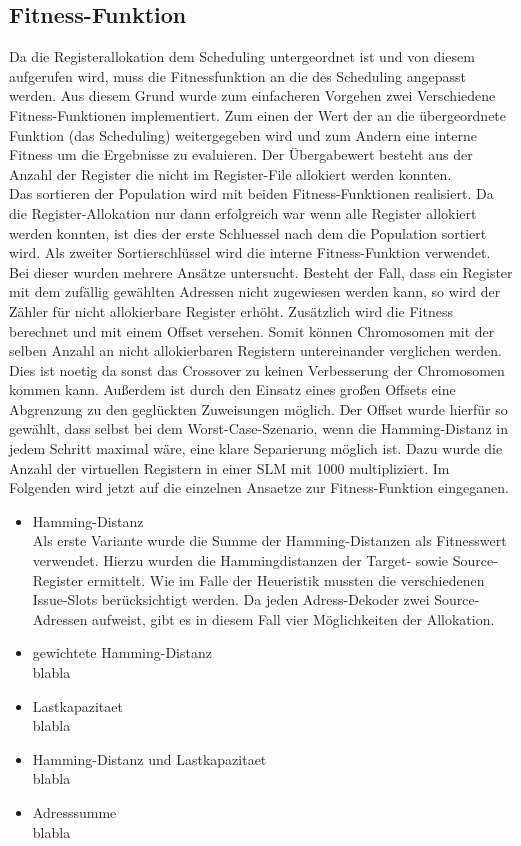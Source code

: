 \subsection{Fitness-Funktion}
\label{chap:Fitness-Funktion}
Da die Registerallokation dem Scheduling untergeordnet ist und von diesem aufgerufen wird, muss die Fitnessfunktion an die des Scheduling angepasst werden. Aus diesem Grund wurde zum einfacheren Vorgehen zwei Verschiedene Fitness-Funktionen implementiert. Zum einen der Wert der an die übergeordnete Funktion (das Scheduling) weitergegeben wird und zum Andern eine interne Fitness um die Ergebnisse zu evaluieren.
Der Übergabewert besteht aus der Anzahl der Register die nicht im Register-File allokiert werden konnten.\\
Das sortieren der Population wird mit beiden Fitness-Funktionen realisiert. Da die Register-Allokation nur dann erfolgreich war wenn alle Register allokiert werden konnten, ist dies der erste Schluessel nach dem die Population sortiert wird. Als zweiter Sortierschlüssel wird die interne Fitness-Funktion verwendet. Bei dieser wurden mehrere Ansätze untersucht.
Besteht der Fall, dass ein Register mit dem zufällig gewählten Adressen nicht zugewiesen werden kann, so wird der Zähler für nicht allokierbare Register erhöht. Zusätzlich wird die Fitness berechnet und mit einem Offset versehen. Somit können Chromosomen mit der selben Anzahl an nicht allokierbaren Registern untereinander verglichen werden. Dies ist noetig da sonst das Crossover zu keinen Verbesserung der Chromosomen kommen kann. Außerdem ist durch den Einsatz eines großen Offsets eine Abgrenzung zu den geglückten Zuweisungen möglich. Der Offset wurde hierfür  so gewählt, dass selbst bei dem Worst-Case-Szenario, wenn die Hamming-Distanz in jedem Schritt maximal wäre, eine klare Separierung möglich ist. Dazu wurde die Anzahl der virtuellen Registern in einer SLM mit 1000 multipliziert.
Im Folgenden wird jetzt auf die einzelnen Ansaetze zur Fitness-Funktion eingeganen.

\begin{itemize}
	\item Hamming-Distanz\\
		Als erste Variante wurde die Summe der Hamming-Distanzen als Fitnesswert verwendet. Hierzu wurden die Hammingdistanzen der Target- sowie Source-Register ermittelt. Wie im Falle der Heueristik mussten die verschiedenen Issue-Slots berücksichtigt werden. Da jeden Adress-Dekoder zwei Source-Adressen aufweist, gibt es in diesem Fall vier Möglichkeiten der Allokation.
	\item gewichtete Hamming-Distanz\\
		blabla
	\item Lastkapazitaet\\
		blabla
	\item Hamming-Distanz und Lastkapazitaet\\
		blabla
	\item Adresssumme\\
		blabla
\end{itemize}
 

